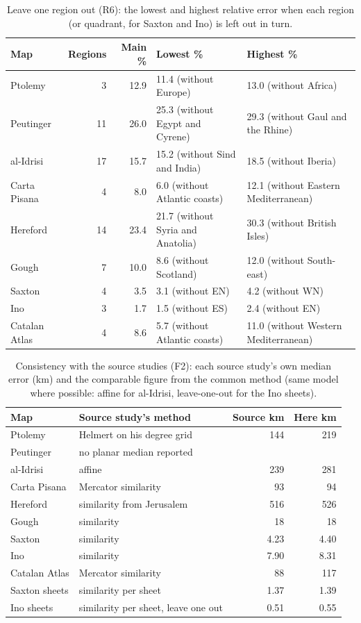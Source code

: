 \documentclass[11pt,a4paper]{article}
\begin{document}
\begin{table}[tbp]\centering\scriptsize\caption{Leave one region out (R6): the lowest and highest relative error when each region (or quadrant, for Saxton and Ino) is left out in turn.}\label{tab:loro}\begin{tabular}{lrrp{4.6cm}p{4.6cm}}\toprule Map & Regions & Main \% & Lowest \% & Highest \%\\\midrule
Ptolemy & 3 & 12.9 & 11.4 (without Europe) & 13.0 (without Africa)\\
Peutinger & 11 & 26.0 & 25.3 (without Egypt and Cyrene) & 29.3 (without Gaul and the Rhine)\\
al-Idrisi & 17 & 15.7 & 15.2 (without Sind and India) & 18.5 (without Iberia)\\
Carta Pisana & 4 & 8.0 & 6.0 (without Atlantic coasts) & 12.1 (without Eastern Mediterranean)\\
Hereford & 14 & 23.4 & 21.7 (without Syria and Anatolia) & 30.3 (without British Isles)\\
Gough & 7 & 10.0 & 8.6 (without Scotland) & 12.0 (without South-east)\\
Saxton & 4 & 3.5 & 3.1 (without EN) & 4.2 (without WN)\\
Ino & 3 & 1.7 & 1.5 (without ES) & 2.4 (without EN)\\
Catalan Atlas & 4 & 8.6 & 5.7 (without Atlantic coasts) & 11.0 (without Western Mediterranean)\\
\bottomrule\end{tabular}\end{table}

\begin{table}[tbp]\centering\small\caption{Consistency with the source studies (F2): each source study's own median error (km) and the comparable figure from the common method (same model where possible: affine for al-Idrisi, leave-one-out for the Ino sheets).}\label{tab:src}\begin{tabular}{llrr}\toprule Map & Source study's method & Source km & Here km\\\midrule
Ptolemy & Helmert on his degree grid & 144 & 219\\
Peutinger & no planar median reported & & \\
al-Idrisi & affine & 239 & 281\\
Carta Pisana & Mercator similarity & 93 & 94\\
Hereford & similarity from Jerusalem & 516 & 526\\
Gough & similarity & 18 & 18\\
Saxton & similarity & 4.23 & 4.40\\
Ino & similarity & 7.90 & 8.31\\
Catalan Atlas & Mercator similarity & 88 & 117\\
Saxton sheets & similarity per sheet & 1.37 & 1.39\\
Ino sheets & similarity per sheet, leave one out & 0.51 & 0.55\\
\bottomrule\end{tabular}\end{table}
\end{document}
